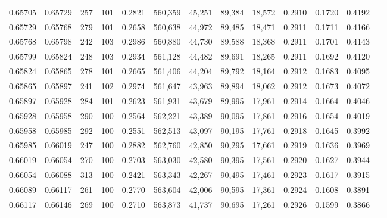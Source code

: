 \begin{tabular}{rrrrrrrrrrrrr}
0.65705 & 0.65729 &   257 & 101 &                                     0.2821 & 560,359 &  45,251 &  89,384 &  18,572 & 0.2910 & 0.1720 & 0.4192 \\
0.65729 & 0.65768 &   279 & 101 &                                     0.2658 & 560,638 &  44,972 &  89,485 &  18,471 & 0.2911 & 0.1711 & 0.4166 \\
0.65768 & 0.65798 &   242 & 103 &                                     0.2986 & 560,880 &  44,730 &  89,588 &  18,368 & 0.2911 & 0.1701 & 0.4143 \\
0.65799 & 0.65824 &   248 & 103 &                                     0.2934 & 561,128 &  44,482 &  89,691 &  18,265 & 0.2911 & 0.1692 & 0.4120 \\
0.65824 & 0.65865 &   278 & 101 &                                     0.2665 & 561,406 &  44,204 &  89,792 &  18,164 & 0.2912 & 0.1683 & 0.4095 \\
0.65865 & 0.65897 &   241 & 102 &                                     0.2974 & 561,647 &  43,963 &  89,894 &  18,062 & 0.2912 & 0.1673 & 0.4072 \\
0.65897 & 0.65928 &   284 & 101 &                                     0.2623 & 561,931 &  43,679 &  89,995 &  17,961 & 0.2914 & 0.1664 & 0.4046 \\
0.65928 & 0.65958 &   290 & 100 &                                     0.2564 & 562,221 &  43,389 &  90,095 &  17,861 & 0.2916 & 0.1654 & 0.4019 \\
0.65958 & 0.65985 &   292 & 100 &                                     0.2551 & 562,513 &  43,097 &  90,195 &  17,761 & 0.2918 & 0.1645 & 0.3992 \\
0.65985 & 0.66019 &   247 & 100 &                                     0.2882 & 562,760 &  42,850 &  90,295 &  17,661 & 0.2919 & 0.1636 & 0.3969 \\
0.66019 & 0.66054 &   270 & 100 &                                     0.2703 & 563,030 &  42,580 &  90,395 &  17,561 & 0.2920 & 0.1627 & 0.3944 \\
0.66054 & 0.66088 &   313 & 100 &                                     0.2421 & 563,343 &  42,267 &  90,495 &  17,461 & 0.2923 & 0.1617 & 0.3915 \\
0.66089 & 0.66117 &   261 & 100 &                                     0.2770 & 563,604 &  42,006 &  90,595 &  17,361 & 0.2924 & 0.1608 & 0.3891 \\
0.66117 & 0.66146 &   269 & 100 &                                     0.2710 & 563,873 &  41,737 &  90,695 &  17,261 & 0.2926 & 0.1599 & 0.3866 \\

\end{tabular}
